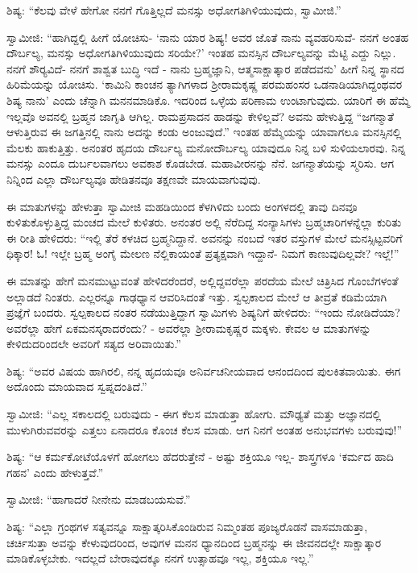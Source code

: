  ಶಿಷ್ಯ: “ಕೆಲವು ವೇಳೆ ಹೇಗೋ ನನಗೆ ಗೊತ್ತಿಲ್ಲದೆ ಮನಸ್ಸು ಅಧೋಗತಿಗಿಳಿಯುವುದು, ಸ್ವಾಮೀಜಿ.” 

\newpage

 ಸ್ವಾಮೀಜಿ: “ಹಾಗಿದ್ದಲ್ಲಿ ಹೀಗೆ ಯೋಚಿಸು- ‘ನಾನು ಯಾರ ಶಿಷ್ಯ! ಅವರ ಜೊತೆ ನಾನು ವ್ಯವಹರಿಸುವೆ- ನನಗೆ ಅಂತಹ ದೌರ್ಬಲ್ಯ, ಮನಸ್ಸು ಅಧೋಗತಿಗಿಳಿಯುವುದು ಸರಿಯೇ?’ ಇಂತಹ ಮನಸ್ಸಿನ ದೌರ್ಬಲ್ಯವನ್ನು ಮೆಟ್ಟಿ ಎದ್ದು ನಿಲ್ಲು. ನನಗೆ ಶೌರ‍್ಯವಿದೆ- ನನಗೆ ಶಾಶ್ವತ ಬುದ್ಧಿ ಇದೆ - ನಾನು ಬ್ರಹ್ಮಜ್ಞಾನಿ, ಆತ್ಮಸಾಕ್ಷಾತ್ಕಾರ ಪಡೆದವನು’ ಹೀಗೆ ನಿನ್ನ ಸ್ಥಾನದ ಹಿರಿಮೆಯನ್ನು ಯೋಚಿಸು. ‘ಕಾಮಿನಿ ಕಾಂಚನ ತ್ಯಾಗಿಗಳಾದ ಶ‍್ರೀರಾಮಕೃಷ್ಣ ಪರಮಹಂಸರ ಒಡನಾಡಿಯಾಗಿದ್ದಂಥವರ ಶಿಷ್ಯ ನಾನು’ ಎಂದು ಚೆನ್ನಾಗಿ ಮನನಮಾಡಿಕೊ. ಇದರಿಂದ ಒಳ್ಳೆಯ ಪರಿಣಾಮ ಉಂಟಾಗುವುದು. ಯಾರಿಗೆ ಈ ಹೆಮ್ಮೆ ಇಲ್ಲವೊ ಅವನಲ್ಲಿ ಬ್ರಹ್ಮನ ಜಾಗೃತಿ ಆಗಿಲ್ಲ. ರಾಮಪ್ರಸಾದನ ಹಾಡನ್ನು ಕೇಳಿಲ್ಲವೆ? ಅವನು ಹೇಳುತ್ತಿದ್ದ “ಜಗನ್ಮಾತೆ ಆಳುತ್ತಿರುವ ಈ ಜಗತ್ತಿನಲ್ಲಿ ನಾನು ಅದನ್ನು ಕಂಡು ಅಂಜುವುದೆ.” ಇಂತಹ ಹೆಮ್ಮೆಯನ್ನು ಯಾವಾಗಲೂ ಮನಸ್ಸಿನಲ್ಲಿ ಮೆಲಕು ಹಾಕುತ್ತಿತ್ತು. ಅನಂತರ ಹೃದಯ ದೌರ್ಬಲ್ಯ ಮನೋದೌರ್ಬಲ್ಯ ಯಾವುದೂ ನಿನ್ನ ಬಳಿ ಸುಳಿಯಲಾರವು. ನಿನ್ನ ಮನಸ್ಸು ಎಂದೂ ದುರ್ಬಲವಾಗಲು ಅವಕಾಶ ಕೊಡಬೇಡ. ಮಹಾವೀರನನ್ನು ನೆನೆ. ಜಗನ್ಮಾತೆಯನ್ನು ಸ್ಮರಿಸು. ಆಗ ನಿನ್ನಿಂದ ಎಲ್ಲಾ ದೌರ್ಬಲ್ಯವೂ ಹೇಡಿತನವೂ ತಕ್ಷಣವೇ ಮಾಯವಾಗುವುವು. 

 ಈ ಮಾತುಗಳನ್ನು ಹೇಳುತ್ತಾ ಸ್ವಾಮೀಜಿ ಮಹಡಿಯಿಂದ ಕೆಳಗಿಳಿದು ಬಂದು ಅಂಗಳದಲ್ಲಿ ತಾವು ದಿನವೂ ಕುಳಿತುಕೊಳ್ಳುತ್ತಿದ್ದ ಮಂಚದ ಮೇಲೆ ಕುಳಿತರು. ಅನಂತರ ಅಲ್ಲಿ ನೆರೆದಿದ್ದ ಸಂನ್ಯಾಸಿಗಳು ಬ್ರಹ್ಮಚಾರಿಗಳನ್ನೆಲ್ಲಾ ಕುರಿತು ಈ ರೀತಿ ಹೇಳಿದರು: “ಇಲ್ಲಿ ತೆರೆ ಕಳಚಿದ ಬ್ರಹ್ಮನಿದ್ದಾನೆ. ಅವನನ್ನು ನಂಬದೆ ಇತರ ವಸ್ತುಗಳ ಮೇಲೆ ಮನಸ್ಸಿಟ್ಟವರಿಗೆ ಧಿಕ್ಕಾರ! ಓ! ಇಲ್ಲೇ ಬ್ರಹ್ಮ ಅಂಗೈ ಮೇಲಣ ನೆಲ್ಲಿಕಾಯಂತೆ ಪ್ರತ್ಯಕ್ಷವಾಗಿ ಇದ್ದಾನೆ- ನಿಮಗೆ ಕಾಣುವುದಿಲ್ಲವೇ? ಇಲ್ಲೆ!” 

 ಈ ಮಾತನ್ನು ಹೇಗೆ ಮನಮುಟ್ಟುವಂತೆ ಹೇಳಿದರೆಂದರೆ, ಅಲ್ಲಿದ್ದವರೆಲ್ಲಾ ಪರದೆಯ ಮೇಲೆ ಚಿತ್ರಿಸಿದ ಗೊಂಬೆಗಳಂತೆ ಅಲ್ಲಾಡದೆ ನಿಂತರು. ಎಲ್ಲರನ್ನೂ ಗಾಢಧ್ಯಾನ ಆವರಿಸಿದಂತೆ ಇತ್ತು. ಸ್ವಲ್ಪಕಾಲದ ಮೇಲೆ ಆ ತೀವ್ರತೆ ಕಡಿಮೆಯಾಗಿ ಪ್ರಜ್ಞೆಗೆ ಬಂದರು. ಸ್ವಲ್ಪಕಾಲದ ನಂತರ ನಡೆಯುತ್ತಿದ್ದಾಗ ಸ್ವಾಮಿಗಳು ಶಿಷ್ಯನಿಗೆ ಹೇಳಿದರು: “ಇಂದು ನೋಡಿದೆಯಾ? ಅವರೆಲ್ಲಾ ಹೇಗೆ ಏಕಮನಸ್ಕರಾದರೆಂದು? - ಅವರೆಲ್ಲಾ ಶ‍್ರೀರಾಮಕೃಷ್ಣರ ಮಕ್ಕಳು. ಕೇವಲ ಆ ಮಾತುಗಳನ್ನು ಕೇಳಿದುದರಿಂದಲೇ ಅವರಿಗೆ ಸತ್ಯದ ಅರಿವಾಯಿತು.” 

 ಶಿಷ್ಯ: “ಅವರ ವಿಷಯ ಹಾಗಿರಲಿ, ನನ್ನ ಹೃದಯವೂ ಅನಿರ್ವಚನೀಯವಾದ ಆನಂದದಿಂದ ಪುಲಕಿತವಾಯಿತು. ಈಗ ಅದೊಂದು ಮಾಯವಾದ ಸ್ವಪ್ನದಂತಿದೆ.” 

 ಸ್ವಾಮೀಜಿ: “ಎಲ್ಲ ಸಕಾಲದಲ್ಲಿ ಬರುವುದು - ಈಗ ಕೆಲಸ ಮಾಡುತ್ತಾ ಹೋಗು. ಮೌಢ್ಯತೆ ಮತ್ತು ಅಜ್ಞಾನದಲ್ಲಿ ಮುಳುಗಿರುವವರನ್ನು ಎತ್ತಲು ಏನಾದರೂ ಕೊಂಚ ಕೆಲಸ ಮಾಡು. ಆಗ ನಿನಗೆ ಅಂತಹ ಅನುಭವಗಳು ಬರುವುವು!” 

\newpage

 ಶಿಷ್ಯ: “ಆ ಕರ್ಮಕೋಟೆಯೊಳಗೆ ಹೋಗಲು ಹೆದರುತ್ತೇನೆ - ಅಷ್ಟು ಶಕ್ತಿಯೂ ಇಲ್ಲ- ಶಾಸ್ತ್ರಗಳೂ ‘ಕರ್ಮದ ಹಾದಿ ಗಹನ’ ಎಂದು ಹೇಳುತ್ತವೆ.” 

 ಸ್ವಾಮೀಜಿ: “ಹಾಗಾದರೆ ನೀನೇನು ಮಾಡಬಯಸುವೆ.” 

 ಶಿಷ್ಯ: “ಎಲ್ಲಾ ಗ್ರಂಥಗಳ ಸತ್ಯವನ್ನೂ ಸಾಕ್ಷಾತ್ಕರಿಸಿಕೊಂಡಿರುವ ನಿಮ್ಮಂತಹ ಪೂಜ್ಯರೊಡನೆ ವಾಸಮಾಡುತ್ತಾ, ಚರ್ಚಿಸುತ್ತಾ ಅವನ್ನು ಕೇಳುವುದರಿಂದ, ಅವುಗಳ ಮನನ ಧ್ಯಾನದಿಂದ ಬ್ರಹ್ಮನನ್ನು ಈ ಜೀವನದಲ್ಲೇ ಸಾಕ್ಷಾತ್ಕಾರ ಮಾಡಿಕೊಳ್ಳಬೇಕು. ಇದಲ್ಲದೆ ಬೇರಾವುದಕ್ಕೂ ನನಗೆ ಉತ್ಸಾಹವೂ ಇಲ್ಲ, ಶಕ್ತಿಯೂ ಇಲ್ಲ.” 

